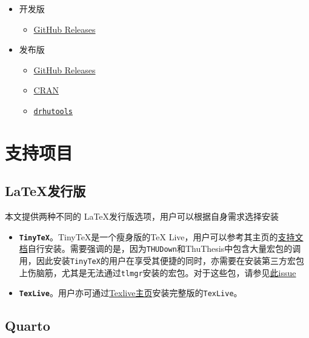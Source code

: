 \begin{itemize}
\item
  开发版

  \begin{itemize}
  \tightlist
  \item
    \href{https://github.com/syfyufei}{GitHub Releases}
  \end{itemize}
\item
  发布版

  \begin{itemize}
  \item
    \href{https://github.com/syfyufei/thudown}{GitHub Releases}
  \item
    \href{}{CRAN}
  \item
    \href{https://sammo3182.github.io/software/drhutools/}{\texttt{drhutools}}
  \end{itemize}
\end{itemize}

\hypertarget{ux652fux6301ux9879ux76ee}{%
\section{支持项目}\label{ux652fux6301ux9879ux76ee}}

\hypertarget{ux53d1ux884cux7248}{%
\subsection{\texorpdfstring{\LaTeX 发行版}{发行版}}\label{ux53d1ux884cux7248}}

本文提供两种不同的 \LaTeX 发行版选项，用户可以根据自身需求选择安装

\begin{itemize}
\item
  \textbf{\texttt{TinyTeX}}。TinyTeX是一个瘦身版的TeX
  Live，用户可以参考其主页的\href{https://yihui.org/tinytex/}{支持文档}自行安装。需要强调的是，因为\texttt{THUDown}和ThuThesis中包含大量宏包的调用，因此安装\texttt{TinyTeX}的用户在享受其便捷的同时，亦需要在安装第三方宏包上伤脑筋，尤其是无法通过\texttt{tlmgr}安装的宏包。对于这些包，请参见\href{https://github.com/rstudio/tinytex/issues/126\#issuecomment-503020154}{此issue}
\item
  \textbf{\texttt{TexLive}}。用户亦可通过\href{https://tug.org/texlive/}{Texlive主页}安装完整版的\texttt{TexLive}。
\end{itemize}

\hypertarget{quarto}{%
\subsection{Quarto}\label{quarto}}

